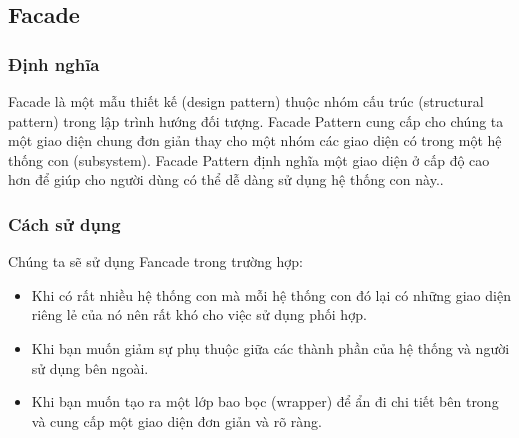 \subsection{Facade}
\subsubsection{Định nghĩa}
Facade là một mẫu thiết kế (design pattern) thuộc nhóm cấu trúc (structural pattern) trong lập trình hướng đối tượng. Facade Pattern cung cấp cho chúng ta một giao diện chung đơn giản thay cho một nhóm các giao diện có trong một hệ thống con (subsystem). Facade Pattern định nghĩa một giao diện ở cấp độ cao hơn để giúp cho người dùng có thể dễ dàng sử dụng hệ thống con này..
\subsubsection{Cách sử dụng}
Chúng ta sẽ sử dụng Fancade trong trường hợp:
\begin{itemize}
    \item Khi có rất nhiều hệ thống con mà mỗi hệ thống con đó lại có những giao diện riêng lẻ của nó nên rất khó cho việc sử dụng phối hợp.
    \item Khi bạn muốn giảm sự phụ thuộc giữa các thành phần của hệ thống và người sử dụng bên ngoài.
    \item Khi bạn muốn tạo ra một lớp bao bọc (wrapper) để ẩn đi chi tiết bên trong và cung cấp một giao diện đơn giản và rõ ràng.
\end{itemize}

